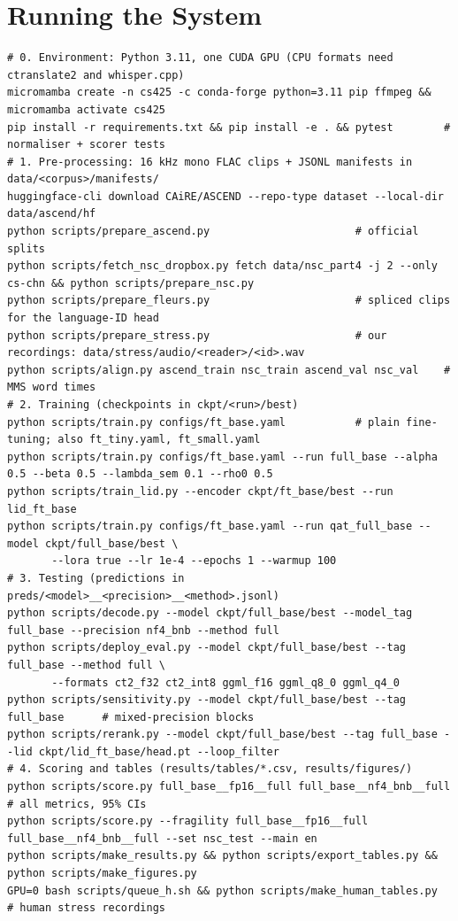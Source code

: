 \section{Running the System}
\label{sec:running}

\begin{table}[t]
\centering
\scriptsize
\begin{verbatim}
# 0. Environment: Python 3.11, one CUDA GPU (CPU formats need ctranslate2 and whisper.cpp)
micromamba create -n cs425 -c conda-forge python=3.11 pip ffmpeg && micromamba activate cs425
pip install -r requirements.txt && pip install -e . && pytest        # normaliser + scorer tests
# 1. Pre-processing: 16 kHz mono FLAC clips + JSONL manifests in data/<corpus>/manifests/
huggingface-cli download CAiRE/ASCEND --repo-type dataset --local-dir data/ascend/hf
python scripts/prepare_ascend.py                       # official splits
python scripts/fetch_nsc_dropbox.py fetch data/nsc_part4 -j 2 --only cs-chn && python scripts/prepare_nsc.py
python scripts/prepare_fleurs.py                       # spliced clips for the language-ID head
python scripts/prepare_stress.py                       # our recordings: data/stress/audio/<reader>/<id>.wav
python scripts/align.py ascend_train nsc_train ascend_val nsc_val    # MMS word times
# 2. Training (checkpoints in ckpt/<run>/best)
python scripts/train.py configs/ft_base.yaml           # plain fine-tuning; also ft_tiny.yaml, ft_small.yaml
python scripts/train.py configs/ft_base.yaml --run full_base --alpha 0.5 --beta 0.5 --lambda_sem 0.1 --rho0 0.5
python scripts/train_lid.py --encoder ckpt/ft_base/best --run lid_ft_base
python scripts/train.py configs/ft_base.yaml --run qat_full_base --model ckpt/full_base/best \
       --lora true --lr 1e-4 --epochs 1 --warmup 100
# 3. Testing (predictions in preds/<model>__<precision>__<method>.jsonl)
python scripts/decode.py --model ckpt/full_base/best --model_tag full_base --precision nf4_bnb --method full
python scripts/deploy_eval.py --model ckpt/full_base/best --tag full_base --method full \
       --formats ct2_f32 ct2_int8 ggml_f16 ggml_q8_0 ggml_q4_0
python scripts/sensitivity.py --model ckpt/full_base/best --tag full_base      # mixed-precision blocks
python scripts/rerank.py --model ckpt/full_base/best --tag full_base --lid ckpt/lid_ft_base/head.pt --loop_filter
# 4. Scoring and tables (results/tables/*.csv, results/figures/)
python scripts/score.py full_base__fp16__full full_base__nf4_bnb__full     # all metrics, 95% CIs
python scripts/score.py --fragility full_base__fp16__full full_base__nf4_bnb__full --set nsc_test --main en
python scripts/make_results.py && python scripts/export_tables.py && python scripts/make_figures.py
GPU=0 bash scripts/queue_h.sh && python scripts/make_human_tables.py       # human stress recordings
\end{verbatim}
\vspace{-1em}
\caption{Commands to pre-process the data, train, test and score (run from the repository root; GPU chosen with \texttt{CUDA\_VISIBLE\_DEVICES}). The \texttt{scripts/queue\_*.sh} files chain these steps exactly as we ran them.}
\label{tab:commands}
\end{table}

